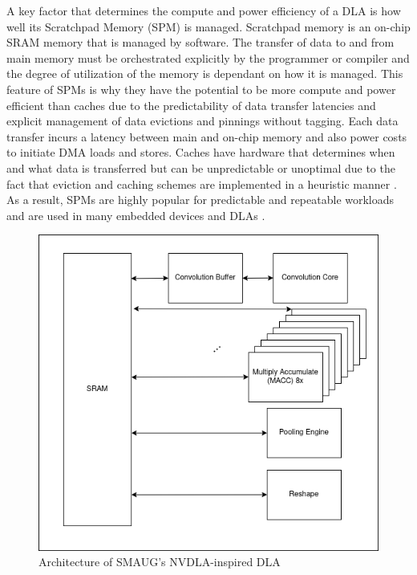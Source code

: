 A key factor that determines the compute and power efficiency of a DLA is how
well its Scratchpad Memory (SPM) is managed. Scratchpad memory is an on-chip
SRAM memory that is managed by software. The transfer of data to and from main
memory must be orchestrated explicitly by the programmer or compiler and the
degree of utilization of the memory is dependant on how it is managed.  This
feature of SPMs is why they have the potential to be more compute and power
efficient than caches due to the predictability of data transfer latencies and
explicit management of data evictions and pinnings without tagging.  Each data
transfer incurs a latency between main and on-chip memory and also power costs
to initiate DMA loads and stores. Caches have hardware that determines when and
what data is transferred but can be unpredictable or unoptimal due to the fact
that eviction and caching schemes are implemented in a heuristic manner
\cite{manyCore}. As a result, SPMs are highly popular for predictable and
repeatable workloads and are used in many embedded devices \cite{graphColoring}
and DLAs \cite{onsram}.


\begin{figure}[th]
\centering
\includegraphics[scale=0.5]{Figures/nvdla.png}
\decoRule
\caption[Reduction]{Architecture of SMAUG's NVDLA-inspired DLA}
\label{fig:Reduction}
\end{figure}

